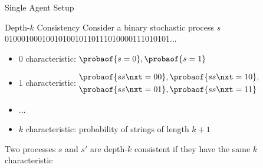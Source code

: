 \begin{frame}{Single Agent Setup}
\end{frame}
\begin{frame}{Depth-\(k\) Consistency}
  Consider a binary stochastic process \(s\)
  0100010001001010010110111010000111010101...

  \bigskip
  \begin{itemize}
    \item \(0\) characteristic: \(\probaof{s = 0}, \probaof{s = 1}\)
    \item \(1\) characteristic: \(
                                \begin{aligned}
                                  &\probaof{s s\nxt = 00}, \probaof{s s\nxt = 10},\\
                                  &\probaof{s s\nxt = 01}, \probaof{s s\nxt = 11}
                                \end{aligned}
                                \)
    \item ...
    \item \(k\) characteristic: probability of strings of length \(k + 1\)
    \end{itemize}

  \bigskip

  Two processes \(s\) and \(s'\) are depth-\(k\) consistent if they have the same \(k\) characteristic
\end{frame}
